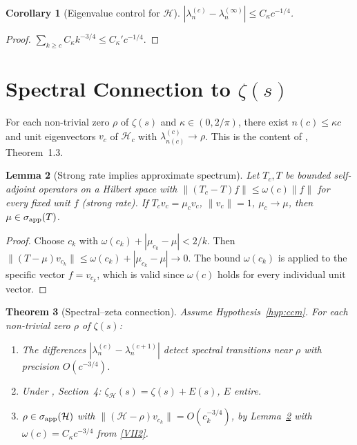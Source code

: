 \documentclass[12pt,a4paper]{amsart}
\newtheorem{theorem}{Theorem}[section]
\newtheorem{lemma}[theorem]{Lemma}
\newtheorem{corollary}[theorem]{Corollary}
\theoremstyle{definition}
\theoremstyle{remark}
\newcommand{\Hc}{\mathcal{H}_c}
\newcommand{\Hlim}{\mathcal{H}}
\begin{document}
\begin{corollary}[Eigenvalue control for $\Hlim$]
\label{cor:eigenvalue-lim}
$|\lambda_n^{(c)}-\lambda_n^{(\infty)}|
\le C_\kappa c^{-1/4}$.
\end{corollary}

\begin{proof}
$\sum_{k\ge c}C_\kappa k^{-3/4}\le C_\kappa'c^{-1/4}$.
\end{proof}

\section{Spectral Connection to $\zeta(s)$}
\label{sec:zeta}

\begin{hypothesis}
\label{hyp:ccm}
For each non-trivial zero $\rho$ of $\zeta(s)$
and $\kappa\in(0,2/\pi)$, there exist
$n(c)\le\kappa c$ and unit eigenvectors $v_c$
of $\Hc$ with $\lambda_{n(c)}^{(c)}\to\rho$.
This is the content of \cite{CCM2025}, Theorem~1.3.
\end{hypothesis}

\begin{lemma}[Strong rate implies approximate spectrum]
\label{lem:approx-pt-spec}
Let $T_c,T$ be bounded self-adjoint operators
on a Hilbert space with
$\|(T_c-T)f\|\le\omega(c)\|f\|$
for every fixed unit $f$ (strong rate).
If $T_cv_c=\mu_c v_c$, $\|v_c\|=1$,
$\mu_c\to\mu$, then $\mu\in\sigma_{\rm app}(T)$.
\end{lemma}

\begin{proof}
Choose $c_k$ with
$\omega(c_k)+|\mu_{c_k}-\mu|<2/k$.
Then
$\|(T-\mu)v_{c_k}\|
\le\omega(c_k)+|\mu_{c_k}-\mu|\to 0$.
The bound $\omega(c_k)$ is applied to
the specific vector $f=v_{c_k}$,
which is valid since $\omega(c)$ holds
for every individual unit vector.
\end{proof}

\begin{theorem}[Spectral--zeta connection]
\label{thm:zeta}
Assume Hypothesis~\ref{hyp:ccm}.
For each non-trivial zero $\rho$ of $\zeta(s)$:
\begin{enumerate}[\rm(i)]
\item The differences $|\lambda_n^{(c)}-\lambda_n^{(c+1)}|$
      detect spectral transitions near $\rho$
      with precision $O(c^{-3/4})$.
\item Under \cite{CCM2025}, Section~4:
      $\zeta_{\Hlim}(s)=\zeta(s)+E(s)$, $E$ entire.
\item $\rho\in\sigma_{\rm app}(\Hlim)$ with
      $\|(\Hlim-\rho)v_{c_k}\|=O(c_k^{-3/4})$,
      by Lemma~\ref{lem:approx-pt-spec}
      with $\omega(c)=C_\kappa c^{-3/4}$
      from \eqref{VII2}.
\end{enumerate}
\end{theorem}
\end{document}
